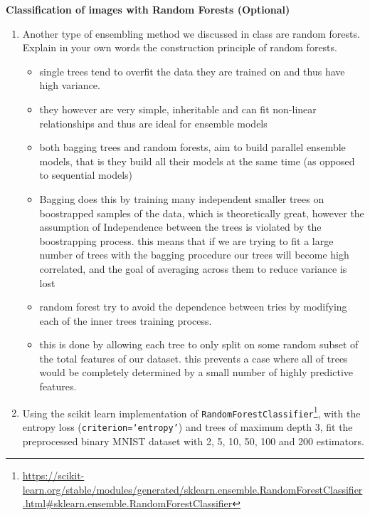 \documentclass{article}
\newcommand{\nyuparagraph}[1]{\vspace{0.3cm}\textcolor{nyupurple}{\bf \large #1}\\}
\theoremstyle{plain}
\theoremstyle{definition}
\begin{document}
\nyuparagraph{Classification of images with Random Forests (Optional)}
\begin{enumerate}
  \setcounter{enumi}{\value{saveenum}}
\item Another type of ensembling method we discussed in class are random forests. Explain in your own words the construction principle of random forests.\\


\begin{itemize}
    \color{blue}
    \item single trees tend to overfit the data they are trained on and thus have high variance. 
    \item they however are very simple, inheritable and can fit non-linear relationships and thus are ideal for ensemble models 
    \item both bagging trees and random forests, aim to build parallel ensemble models, that is they build all their models at the same time (as opposed to sequential models) 
    \item Bagging does this by training many independent smaller trees on boostrapped samples of the data, which is theoretically great, however the assumption of Independence between the trees is violated by the boostrapping process. this means that if we are trying to fit a large number of trees with the bagging procedure our trees will become high correlated, and the goal of averaging across them to reduce variance is lost 
    \item random forest try to avoid the dependence between tries by modifying each of the inner trees training process. 
    \item this is done by allowing each tree to only split on some random subset of the total features of our dataset. this prevents a case where all of trees would be completely determined by a small number of highly predictive features. 
\end{itemize}

\item Using the scikit learn implementation of \texttt{RandomForestClassifier}\footnote{\url{https://scikit-learn.org/stable/modules/generated/sklearn.ensemble.RandomForestClassifier.html\#sklearn.ensemble.RandomForestClassifier}},
with the entropy loss (\texttt{criterion=`entropy'}) and trees of maximum depth 3, fit the preprocessed binary MNIST dataset with 2, 5, 10, 50, 100 and 200 estimators.\\


\end{enumerate}
\end{document}
